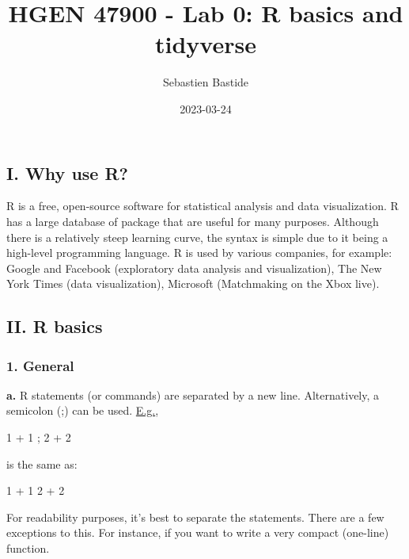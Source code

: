 \documentclass[
]{article}
\title{HGEN 47900 - Lab 0: R basics and tidyverse}
\author{Sebastien Bastide}
\date{2023-03-24}
\newenvironment{Shaded}{\begin{snugshade}}{\end{snugshade}}
\newcommand{\DecValTok}[1]{\textcolor[rgb]{0.00,0.00,0.81}{#1}}
\newcommand{\NormalTok}[1]{#1}
\newcommand{\SpecialCharTok}[1]{\textcolor[rgb]{0.00,0.00,0.00}{#1}}
\begin{document}
\maketitle

\hypertarget{i.-why-use-r}{%
\subsection{I. Why use R?}\label{i.-why-use-r}}

R is a free, open-source software for statistical analysis and data
visualization. R has a large database of package that are useful for
many purposes. Although there is a relatively steep learning curve, the
syntax is simple due to it being a high-level programming language. R is
used by various companies, for example: Google and Facebook (exploratory
data analysis and visualization), The New York Times (data
visualization), Microsoft (Matchmaking on the Xbox live).

\hypertarget{ii.-r-basics}{%
\subsection{II. R basics}\label{ii.-r-basics}}

\hypertarget{general}{%
\subsubsection{1. General}\label{general}}

\textbf{a.} R statements (or commands) are separated by a new line.
Alternatively, a semicolon (;) can be used. \underline{E.g.},

\begin{Shaded}
\begin{Highlighting}[]
\DecValTok{1} \SpecialCharTok{+} \DecValTok{1}\NormalTok{ ; }\DecValTok{2} \SpecialCharTok{+} \DecValTok{2}
\end{Highlighting}
\end{Shaded}

is the same as:

\begin{Shaded}
\begin{Highlighting}[]
\DecValTok{1} \SpecialCharTok{+} \DecValTok{1}
\DecValTok{2} \SpecialCharTok{+} \DecValTok{2}
\end{Highlighting}
\end{Shaded}

For readability purposes, it's best to separate the statements. There
are a few exceptions to this. For instance, if you want to write a very
compact (one-line) function.
\end{document}
